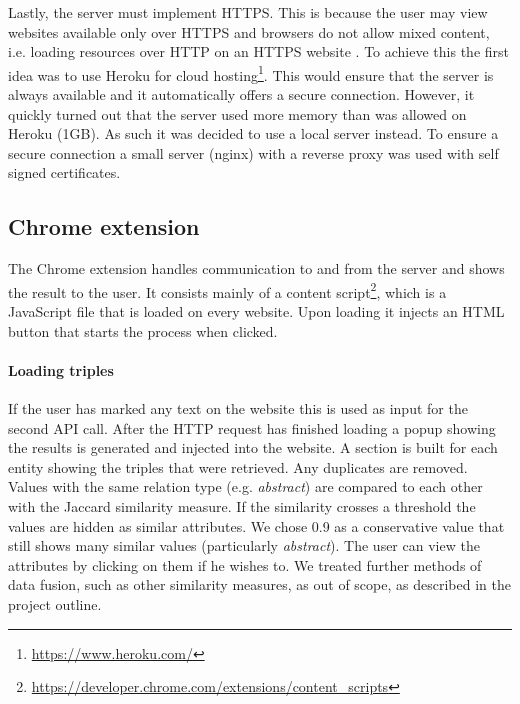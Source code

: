 Lastly, the server must implement HTTPS. This is because the user may view websites available only over HTTPS and browsers do not allow mixed content, i.e. loading resources over HTTP on an HTTPS website \cite{ChromeMixedContent}. To achieve this the first idea was to use Heroku for cloud hosting\footnote{\url{https://www.heroku.com/}}. This would ensure that the server is always available and it automatically offers a secure connection. However, it quickly turned out that the server used more memory than was allowed on Heroku (1GB). As such it was decided to use a local server instead. To ensure a secure connection a small server (nginx) with a reverse proxy was used with self signed certificates\cite{nginxReverseProxy}. 




\subsection{Chrome extension}

The Chrome extension handles communication to and from the server and shows the result to the user. It consists mainly of a content script\footnote{\url{https://developer.chrome.com/extensions/content_scripts}}, which is a JavaScript file that is loaded on every website. Upon loading it injects an HTML button that starts the process when clicked. 

\paragraph{Loading triples}
If the user has marked any text on the website this is used as input for the second API call. After the HTTP request has finished loading a popup showing the results is generated and injected into the website. A section is built for each entity showing the triples that were retrieved. Any duplicates are removed. Values with the same relation type (e.g. \textit{abstract}) are compared to each other with the Jaccard similarity measure. If the similarity crosses a threshold the values are hidden as similar attributes. We chose 0.9 as a conservative value that still shows many similar values (particularly \textit{abstract}). The user can view the attributes by clicking on them if he wishes to. We treated further methods of data fusion, such as other similarity measures, as out of scope, as described in the project outline. 


